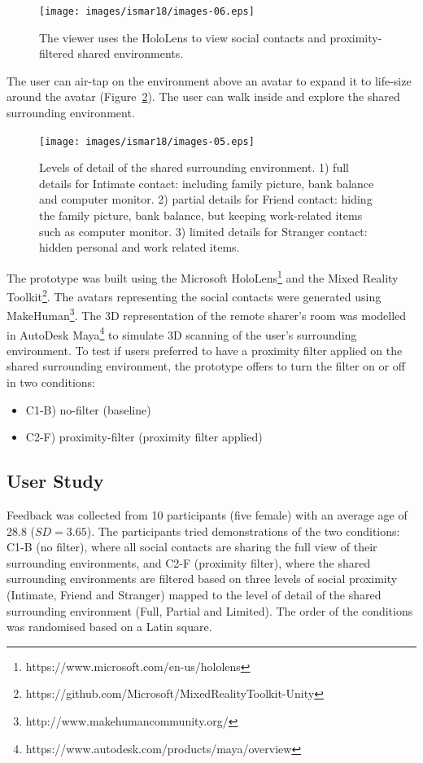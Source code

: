 \begin{figure}[H]
    \centering
    \texttt{[image: images/ismar18/images-06.eps]}
    \caption{The viewer uses the HoloLens to view social contacts and proximity-filtered shared environments.}
    \label{fig:environment:setup}
\end{figure}

The user can air-tap on the environment above an avatar to expand it to life-size around the avatar (Figure~\ref{fig:environment:environment-levels}). The user can walk inside and explore the shared surrounding environment.

\begin{figure}[H]
  \centering
  \texttt{[image: images/ismar18/images-05.eps]}
  \caption{Levels of detail of the shared surrounding environment. 1) full details for Intimate contact: including family picture, bank balance and computer monitor. 2) partial details for Friend contact: hiding the family picture, bank balance, but keeping work-related items such as computer monitor. 3) limited details for Stranger contact: hidden personal and work related items.}
  \label{fig:environment:environment-levels}
\end{figure}


The prototype was built using the Microsoft HoloLens\footnote{https://www.microsoft.com/en-us/hololens} and the Mixed Reality Toolkit\footnote{https://github.com/Microsoft/MixedRealityToolkit-Unity}. The avatars representing the social contacts were generated using MakeHuman\footnote{http://www.makehumancommunity.org/}. The 3D representation of the remote sharer's room was modelled in AutoDesk Maya\footnote{https://www.autodesk.com/products/maya/overview} to simulate 3D scanning of the user's surrounding environment. To test if users preferred to have a proximity filter applied on the shared surrounding environment, the prototype offers to turn the filter on or off in two conditions: 

\begin{itemize}
    \item C1-B) no-filter (baseline)
    \item C2-F) proximity-filter (proximity filter applied)
\end{itemize}{}

\subsection{User Study}

Feedback was collected from 10 participants (five female) with an average age of 28.8 ($SD=3.65$). The participants tried demonstrations of the two conditions: C1-B (no filter), where all social contacts are sharing the full view of their surrounding environments, and C2-F (proximity filter), where the shared surrounding environments are filtered based on three levels of social proximity (Intimate, Friend and Stranger) mapped to the level of detail of the shared surrounding environment (Full, Partial and Limited). The order of the conditions was randomised based on a Latin square. 

